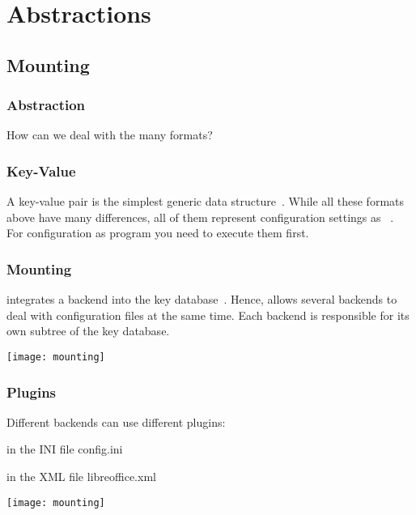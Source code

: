 

\date{29.01.2020}



\renewcommand{\enquote}[1]{\emph{``#1''}} %

\begin{frame}
	\titlepage
	\doclicenseThis
\end{frame}



\section{Abstractions}

\subsection{Mounting}

\begin{frame}
	\frametitle{Abstraction}
	\reqLegacy*

	\vspace{1cm}

	How can we deal with the many formats?
\end{frame}


\begin{frame}
	\frametitle{Key-Value}
A key-value pair is the simplest generic data structure~\cite{strang2004context}.
While all these formats above have many differences, all of them represent configuration settings as ~\cite{jin2014configurations,rabkin2011static,xu2013blame,lathia2013open}.
\\[1cm]

For configuration as program you need to execute them first.
\end{frame}

\begin{frame}
	\frametitle{Mounting}
	 integrates a backend into the key database~\cite{raab2008thesis}.
	Hence, \elektra{} allows several backends to deal with configuration files at the same time.
	Each backend is responsible for its own subtree of the key database.

	\texttt{[image: mounting]}
\end{frame}

\begin{frame}
	\frametitle{Plugins}

	Different backends can use different plugins:
	\begin{description}[labelsep=10cm,align=right]
	\item[\texttt{/sw}] in the INI file config.ini
	\item[\texttt{/sw/libreoffice}] in the XML file libreoffice.xml
	\end{description}

	\texttt{[image: mounting]}
\end{frame}

